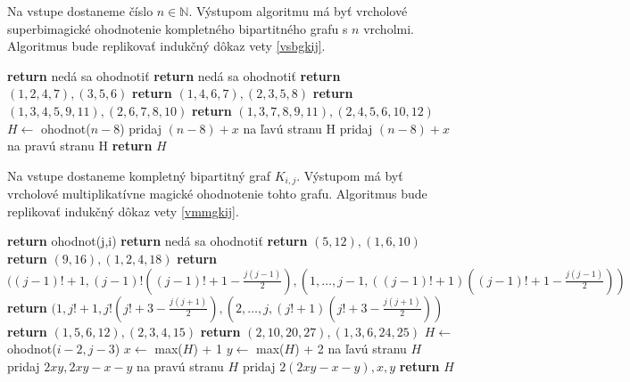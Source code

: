 \begin{alg}
\label{algvsbgkij}
Na vstupe dostaneme číslo $n \in \mathbb{N}$. Výstupom algoritmu má byť vrcholové superbimagické ohodnotenie kompletného bipartitného grafu s $n$ vrcholmi. Algoritmus bude replikovať indukčný dôkaz vety \ref{vsbgkij}.
\end{alg}

\begin{algorithmic}
	\STATE \textbf{return} nedá sa ohodnotiť
\ENDIF
{}
	\STATE \textbf{return} nedá sa ohodnotiť
\ENDIF
{}
	\STATE \textbf{return} $(1, 2, 4, 7), (3, 5, 6)$
\ENDIF
{}
	\STATE \textbf{return} $(1, 4, 6, 7), (2, 3, 5, 8)$
\ENDIF
{}
	\STATE \textbf{return} $(1, 3, 4, 5, 9, 11), (2, 6, 7, 8, 10)$
\ENDIF
{}
	\STATE \textbf{return} $(1, 3, 7, 8, 9, 11), (2, 4, 5, 6, 10, 12)$
\ENDIF
\STATE $H \gets$ ohodnot($n - 8$)
		\STATE pridaj $(n-8)+x$ na ľavú stranu H
	\ELSE
		\STATE pridaj $(n-8)+x$ na pravú stranu H
	\ENDIF
\ENDFOR
\STATE \textbf{return} $H$
\end{algorithmic}

\begin{alg}
\label{algvmmgkij}
Na vstupe dostaneme kompletný bipartitný graf $K_{i,j}$. Výstupom má byť vrcholové multiplikatívne magické ohodnotenie tohto grafu. Algoritmus bude replikovať indukčný dôkaz vety \ref{vmmgkij}.
\end{alg}

\begin{algorithmic}
	\STATE \textbf{return} ohodnot(j,i)
\ENDIF
{}
	\STATE \textbf{return} nedá sa ohodnotiť
\ENDIF
{}
	\STATE \textbf{return} $(5, 12), (1, 6, 10)$
\ENDIF
{}
	\STATE \textbf{return} $(9, 16), (1, 2, 4, 18)$
\ENDIF
{}
	\STATE \textbf{return} $((j-1)! + 1, (j-1)! ((j-1)! + 1 - \frac{j(j-1)}{2}), (1, \dots , j-1, ((j-1)! + 1) ((j-1)! + 1 - \frac{j(j-1)}{2}))$
\ENDIF
{}
	\STATE \textbf{return} $(1, j! + 1, j! (j! + 3 - \frac{j(j+1)}{2}), (2, \dots , j, (j! + 1) (j! + 3 - \frac{j(j+1)}{2}))$
\ENDIF
{}
	\STATE \textbf{return} $(1, 5, 6, 12), (2, 3, 4, 15)$
\ENDIF
{}
	\STATE \textbf{return} $(2, 10, 20, 27), (1, 3, 6, 24, 25)$
\ENDIF
\STATE $H \gets$ ohodnot($i - 2, j - 3$)
\STATE $x \gets$ max($H$) + 1
\STATE $y \gets$ max($H$) + 2
\STATE na ľavú stranu $H$ pridaj $2xy, 2xy - x - y$
\STATE na pravú stranu $H$ pridaj $2(2xy - x - y), x, y$
\STATE \textbf{return} $H$
\end{algorithmic}

